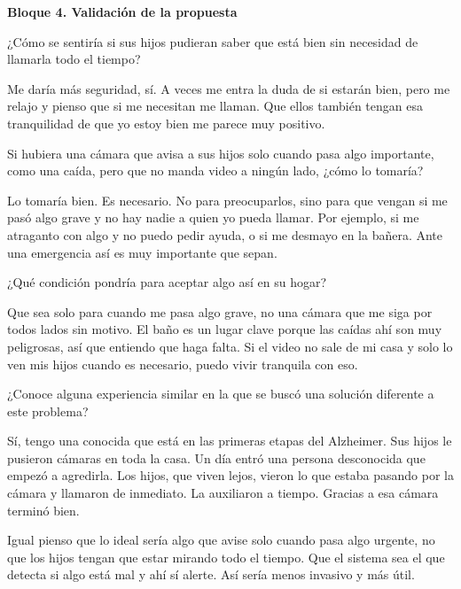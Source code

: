 \bigskip
\textbf{Bloque 4. Validación de la propuesta}

\begin{description}[leftmargin=0cm, labelsep=0.5cm]

    \item[\textbf{Entrevistador:}] ¿Cómo se sentiría si sus hijos pudieran saber que está bien sin necesidad de llamarla todo el tiempo?

    \item[\textbf{Entrevistada:}] Me daría más seguridad, sí.
    A veces me entra la duda de si estarán bien, pero me relajo y pienso que si me necesitan me llaman.
    Que ellos también tengan esa tranquilidad de que yo estoy bien me parece muy positivo.

    \item[\textbf{Entrevistador:}] Si hubiera una cámara que avisa a sus hijos solo cuando pasa algo importante, como una caída, pero que no manda video a ningún lado, ¿cómo lo tomaría?

    \item[\textbf{Entrevistada:}] Lo tomaría bien.
    Es necesario.
    No para preocuparlos, sino para que vengan si me pasó algo grave y no hay nadie a quien yo pueda llamar.
    Por ejemplo, si me atraganto con algo y no puedo pedir ayuda, o si me desmayo en la bañera.
    Ante una emergencia así es muy importante que sepan.

    \item[\textbf{Entrevistador:}] ¿Qué condición pondría para aceptar algo así en su hogar?

    \item[\textbf{Entrevistada:}] Que sea solo para cuando me pasa algo grave, no una cámara que me siga por todos lados sin motivo.
    El baño es un lugar clave porque las caídas ahí son muy peligrosas, así que entiendo que haga falta.
    Si el video no sale de mi casa y solo lo ven mis hijos cuando es necesario, puedo vivir tranquila con eso.

    \item[\textbf{Entrevistador:}] ¿Conoce alguna experiencia similar en la que se buscó una solución diferente a este problema?

    \item[\textbf{Entrevistada:}] Sí, tengo una conocida que está en las primeras etapas del Alzheimer.
    Sus hijos le pusieron cámaras en toda la casa.
    Un día entró una persona desconocida que empezó a agredirla.
    Los hijos, que viven lejos, vieron lo que estaba pasando por la cámara y llamaron de inmediato.
    La auxiliaron a tiempo.
    Gracias a esa cámara terminó bien.

    Igual pienso que lo ideal sería algo que avise solo cuando pasa algo urgente, no que los hijos tengan que estar mirando todo el tiempo.
    Que el sistema sea el que detecta si algo está mal y ahí sí alerte.
    Así sería menos invasivo y más útil.

\end{description}